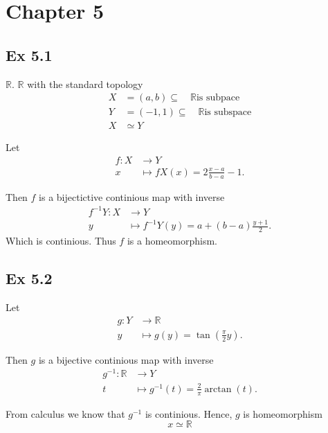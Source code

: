 \documentclass{article}
\theoremstyle{remark}
\begin{document}
\newpage
\section*{Chapter 5}%
\label{sec:chapter_5}

\subsection*{Ex 5.1}%
\label{sub:ex_5_1}

$\mathbb{R} $. $\mathbb{R} $  with the standard topology \[
\begin{split}
    X & = \left( a,b \right) \subseteq  \quad  \mathbb{R}  \text{is subpace} \\
    Y &= \left( -1,1 \right) \subseteq \quad   \mathbb{R} \text{is subspace} \\
    X  &  \simeq   Y
\end{split}
\]

Let  \begin{align*}
    f:  X &\longrightarrow  Y \\
     x&\longmapsto fX(x) =2  \frac{ x-a }{b-a}  - 1
.\end{align*}

Then $f$  is a bijectictive continious map with inverse \begin{align*}
    f^{-1}Y: X &\longrightarrow Y \\
    y &\longmapsto f^{-1}Y(y) = a + \left( b-a \right) \frac{y+1}{2}
.\end{align*}
Which is continious. Thus $f$  is a homeomorphism.

\subsection*{Ex 5.2}%
\label{ssub:ex_5_2}

Let \begin{align*}
    g: Y &\longrightarrow \mathbb{R}  \\
    y &\longmapsto g(y) = \tan \left( \frac{\pi}{2}  y \right)
.\end{align*}

Then $g$   is a bijective continious map with inverse \begin{align*}
    g^{-1}: \mathbb{R}  &\longrightarrow Y \\
     t &\longmapsto g^{-1}(t) = \frac{2}{\pi } \arctan \left( t \right)
.\end{align*}

From calculus we know that $g^{-1}$  is continious. Hence, $g$  is homeomorphism \[
x \simeq \mathbb{R}
\]
\end{document}
